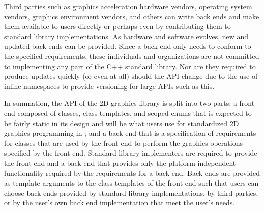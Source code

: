 \pnum
Third parties such as graphics acceleration hardware vendors, operating system vendors, graphics environment vendors, and others can write back ends and make them available to users directly or perhaps even by contributing them to standard library implementations. As hardware and software evolves, new and updated back ends can be provided. Since a back end only needs to conform to the specified requirements, these individuals and organizations are not committed to implementing any part of the C++ standard library. Nor are they required to produce updates quickly (or even at all) should the API change due to the use of inline namespaces to provide versioning for large APIs such as this.

\pnum
In summation, the API of the 2D graphics library is split into two parts: a front end composed of classes, class templates, and scoped enums that is expected to be fairly static in its design and will be what users use for standardized 2D graphics programming in \Cpp; and a back end that is a specification of requirements for classes that are used by the front end to perform the graphics operations specified by the front end. Standard library implementers are required to provide the front end and a back end that provides only the platform-independent functionality required by the requirements for a back end. Back ends are provided as template arguments to the class templates of the front end such that users can choose back ends provided by standard library implementations, by third parties, or by the user's own back end implementation that meet the user's needs.